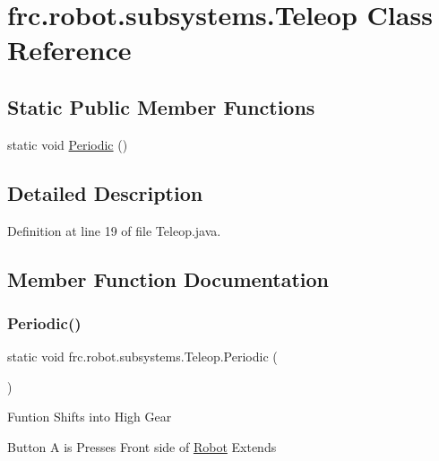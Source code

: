 \hypertarget{classfrc_1_1robot_1_1subsystems_1_1Teleop}{}\section{frc.\+robot.\+subsystems.\+Teleop Class Reference}
\label{classfrc_1_1robot_1_1subsystems_1_1Teleop}
\subsection*{Static Public Member Functions}
\begin{DoxyCompactItemize}
\item 
static void \hyperlink{classfrc_1_1robot_1_1subsystems_1_1Teleop_ae90969b779b855da532e50706fa33401}{Periodic} ()
\end{DoxyCompactItemize}


\subsection{Detailed Description}


Definition at line 19 of file Teleop.\+java.



\subsection{Member Function Documentation}
\mbox{\label{classfrc_1_1robot_1_1subsystems_1_1Teleop_ae90969b779b855da532e50706fa33401}} 
\subsubsection{\texorpdfstring{Periodic()}{Periodic()}}
{\footnotesize\ttfamily static void frc.\+robot.\+subsystems.\+Teleop.\+Periodic (\begin{DoxyParamCaption}{ }\end{DoxyParamCaption})\hspace{0.3cm}{\ttfamily [static]}}

Funtion Shifts into High Gear

Button A is Presses Front side of \hyperlink{classfrc_1_1robot_1_1Robot}{Robot} Extends

